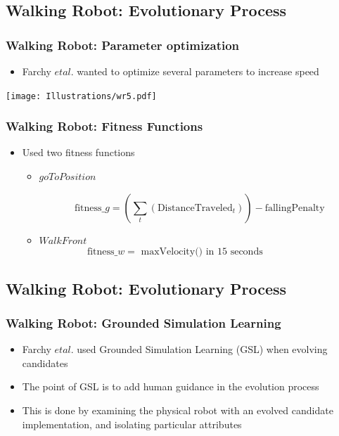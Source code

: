 \documentclass{beamer}
\begin{document}
\subsection{Walking Robot: Evolutionary Process}
\begin{frame}
  \frametitle{Walking Robot: Parameter optimization}
\begin{itemize}
\item Farchy $et al.$ wanted to optimize several parameters to increase speed
\end{itemize}
\begin{center}
 \texttt{[image: Illustrations/wr5.pdf]}
       \\
\end{center}
\end{frame}

\begin{frame}[fragile]
  \frametitle{Walking Robot: Fitness Functions}
\begin{itemize}
\item Used two fitness functions
\begin{itemize}
\item $goToPosition$

\[
  \textrm{fitness}\_g = (\sum_{t} (\textrm{DistanceTraveled}_t)) - \textrm{fallingPenalty}
\]
\item $WalkFront$
\[
  \textrm{fitness}\_w = \textrm{ maxVelocity() in 15 seconds} \qquad\qquad\quad
\]
\end{itemize}
\end{itemize}

\end{frame}

\subsection{Walking Robot: Evolutionary Process}
\begin{frame}
  \frametitle{Walking Robot: Grounded Simulation Learning}
  \begin{itemize}
  \item Farchy $et al.$ used Grounded Simulation Learning (GSL) when evolving candidates
  \item The point of GSL is to add human guidance in the evolution process
  \item This is done by examining the physical robot with an evolved candidate implementation, and isolating particular attributes
  \end{itemize}
\end{frame}
\end{document}
